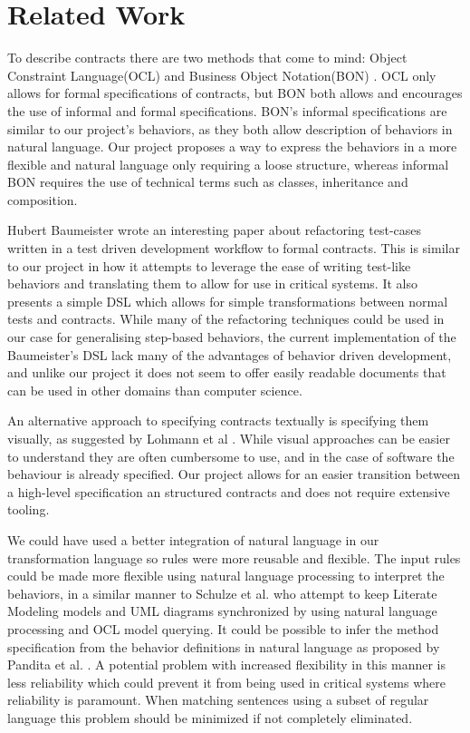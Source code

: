 \section{Related Work}
\label{sec:RelatedWork}
To describe contracts there are two methods that come to mind: Object Constraint Language(OCL) \cite{omg2010} and Business Object Notation(BON) \cite{walden1995}.
OCL only allows for formal specifications of contracts, but BON both allows and encourages the use of informal and formal specifications.
BON's informal specifications are similar to our project's behaviors, as they both allow description of behaviors in natural language.
Our project proposes a way to express the behaviors in a more flexible and natural language only requiring a loose structure, whereas informal BON requires the use of technical terms such as classes, inheritance and composition.

Hubert Baumeister wrote an interesting paper \cite{baumeister2004} about refactoring test-cases written in a test driven development workflow to formal contracts.
This is similar to our project in how it attempts to leverage the ease of writing test-like behaviors and translating them to allow for use in critical systems.
It also presents a simple DSL which allows for simple transformations between normal tests and contracts.
While many of the refactoring techniques could be used in our case for generalising step-based behaviors, the current implementation of the Baumeister’s DSL lack many of the advantages of behavior driven development, and unlike our project it does not seem to offer easily readable documents that can be used in other domains than computer science.

An alternative approach to specifying contracts textually is specifying them visually, as suggested by Lohmann et al \cite{lohmann2006}. While visual approaches can be easier to understand they are often cumbersome to use, and in the case of software the behaviour is already specified.
Our project allows for an easier transition between a high-level specification an structured contracts and does not require extensive tooling.

We could have used a better integration of natural language in our transformation language so rules were more reusable and flexible. 
The input rules could be made more flexible using natural language processing to interpret the behaviors, in a similar manner to Schulze et al. \cite{schulze2012} who attempt to keep Literate Modeling models and UML diagrams synchronized by using natural language processing and OCL model querying.
It could be possible to infer the method specification from the behavior definitions in natural language as proposed by Pandita et al. \cite{pandita2012}.
A potential problem with increased flexibility in this manner is less reliability which could prevent it from being used in critical systems where reliability is paramount.
When matching sentences using a subset of regular language this problem should be minimized if not completely eliminated.
